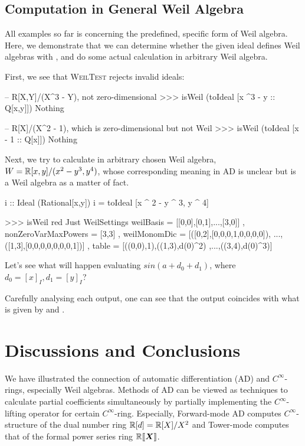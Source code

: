 \documentclass[%
  sigconf,authorversion,screen]{acmart}
\begin{document}
\subsection{Computation in General Weil Algebra}
All examples so far is concerning the predefined, specific form of Weil algebra.
Here, we demonstrate that we can determine whether the given ideal defines Weil algebras with , and do some actual calculation in arbitrary Weil algebra.

First, we see that \textsc{WeilTest} rejects invalid ideals:

\begin{code}
-- R[X,Y]/(X^3 - Y), not zero-dimensional
>>> isWeil (toIdeal [x ^3 - y :: Q[x,y]])
Nothing

-- R[X]/(X^2 - 1), which is zero-dimensional but not Weil
>>> isWeil (toIdeal [x - 1 :: Q[x]])
Nothing
\end{code}

Next, we try to calculate in arbitrary chosen Weil algebra, $W = \mathbb{R}[x,y]/(x^2 - y^3, y^4)$, whose corresponding meaning in AD is unclear but is a Weil algebra as a matter of fact.

\begin{code}
i :: Ideal (Rational[x,y])
i = toIdeal [x ^ 2 - y ^ 3, y ^ 4]

>>> isWeil red
Just WeilSettings 
  {weilBasis =
    [[0,0],[0,1],...,[3,0]]
  , nonZeroVarMaxPowers = [3,3]
  , weilMonomDic = 
    [([0,2],[0,0,0,1,0,0,0,0]),
      ...,([1,3],[0,0,0,0,0,0,0,1])]
  , table = [((0,0),1),((1,3),d(0)^2)
      ,...,((3,4),d(0)^3)]
  }
\end{code}

Let's see what will happen evaluating $sin(a + d_0 + d_1)$, where $d_0 = [x]_I, d_1 = [y]_I$?


Carefully analysing each output, one can see that the output coincides with what is given by  and .

\section{Discussions and Conclusions}\label{sec:concl}
We have illustrated the connection of automatic differentiation (AD) and $C^\infty$-rings, especially Weil algebras.
Methods of AD can be viewed as techniques to calculate partial coefficients simultaneously by partially implementing the $C^\infty$-lifting operator for certain $C^\infty$-ring.
Especially, Forward-mode AD computes $C^\infty$-structure of the dual number ring $\mathbb{R}[d] = \mathbb{R}[X]/X^2$ and Tower-mode computes that of the formal power series ring $\mathord{\mathbb{R}\llbracket\boldsymbol{X}\rrbracket}$.
\end{document}
